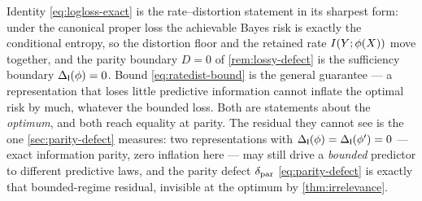 \begin{remark}
\label{rem:ratedist-reading}
Identity \eqref{eq:logloss-exact} is the rate--distortion statement in its
sharpest form: under the canonical proper loss the achievable Bayes risk is
exactly the conditional entropy, so the distortion floor and the retained rate
$I(Y ; \phi(X))$ move together, and the parity boundary $D=0$ of
\cref{rem:lossy-defect} is the sufficiency boundary $\Delta_{\mathsf{I}}\!\left(\phi\right)=0$. Bound
\eqref{eq:ratedist-bound} is the general guarantee --- a representation that
loses little predictive information cannot inflate the optimal risk by much,
whatever the bounded loss. Both are statements about the \emph{optimum}, and
both reach equality at parity. The residual they cannot see is the one
\cref{sec:parity-defect} measures: two representations with
$\Delta_{\mathsf{I}}\!\left(\phi\right)=\Delta_{\mathsf{I}}\!\left(\phi'\right)=0$ --- exact information parity, zero inflation
here --- may still drive a \emph{bounded} predictor to different predictive
laws, and the parity defect $\delta_{\mathrm{par}}$ \eqref{eq:parity-defect} is exactly
that bounded-regime residual, invisible at the optimum by
\cref{thm:irrelevance}.
\end{remark}
